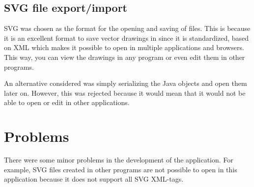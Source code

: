 \documentclass[11pt, a4paper]{article}
\begin{document}
\subsection{SVG file export/import}

SVG was chosen as the format for the opening and saving of files. This is because it is an excellent format to save vector drawings in since it is standardized, based on XML which makes it possible to open in multiple applications and browsers. This way, you can view the drawings in any program or even edit them in other programs. 

An alternative considered was simply serializing the Java objects and open them later on. However, this was rejected because it would mean that it would not be able to open or edit in other applications. 

\section{Problems}

There were some minor problems in the development of the application. For example, SVG files created in other programs are not possible to open in this application because it does not support all SVG XML-tags.
\end{document}
